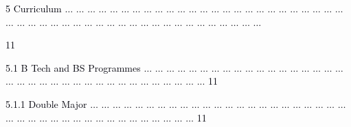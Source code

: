 \documentclass[12pt]{article}
\begin{document}
\vspace{\baselineskip}
{\fontsize{7pt}{8.4pt}\selectfont \textcolor[HTML]{00000A}{5 Curriculum $ \ldots $ $ \ldots $ $ \ldots $ $ \ldots $ $ \ldots $ $ \ldots $ $ \ldots $ $ \ldots $ $ \ldots $ $ \ldots $ $ \ldots $ $ \ldots $ $ \ldots $ $ \ldots $ $ \ldots $ $ \ldots $ $ \ldots $ $ \ldots $ $ \ldots $ $ \ldots $ $ \ldots $ $ \ldots $ $ \ldots $ $ \ldots $ $ \ldots $ $ \ldots $ $ \ldots $ $ \ldots $ $ \ldots $ $ \ldots $ $ \ldots $ $ \ldots $ $ \ldots $ $ \ldots $ $ \ldots $ $ \ldots $ $ \ldots $ $ \ldots $ $ \ldots $ $ \ldots $ $ \ldots $ $ \ldots $ $ \ldots $ $ \ldots $ $ \ldots $ $ \ldots $ $ \ldots $ $ \ldots $  \tabto{5.49in} }{\fontsize{8pt}{9.6pt}\selectfont \textcolor[HTML]{00000A}{11}\par}\par}\par


\vspace{\baselineskip}
\begin{adjustwidth}{0.21in}{0.0in}
{\fontsize{7pt}{8.4pt}\selectfont \textcolor[HTML]{00000A}{5.1 B Tech and BS Programmes $ \ldots $ $ \ldots $ $ \ldots $ $ \ldots $ $ \ldots $ $ \ldots $ $ \ldots $ $ \ldots $ $ \ldots $ $ \ldots $ $ \ldots $ $ \ldots $ $ \ldots $ $ \ldots $ $ \ldots $ $ \ldots $ $ \ldots $ $ \ldots $ $ \ldots $ $ \ldots $ $ \ldots $ $ \ldots $ $ \ldots $ $ \ldots $ $ \ldots $ $ \ldots $ $ \ldots $ $ \ldots $ $ \ldots $ $ \ldots $ $ \ldots $ $ \ldots $ $ \ldots $ $ \ldots $ $ \ldots $ ... 11}\par}\par

\end{adjustwidth}


\vspace{\baselineskip}
\begin{adjustwidth}{0.5in}{0.0in}
{\fontsize{7pt}{8.4pt}\selectfont \textcolor[HTML]{00000A}{5.1.1 Double Major $ \ldots $ $ \ldots $ $ \ldots $ $ \ldots $ $ \ldots $ $ \ldots $ $ \ldots $ $ \ldots $ $ \ldots $ $ \ldots $ $ \ldots $ $ \ldots $ $ \ldots $ $ \ldots $ $ \ldots $ $ \ldots $ $ \ldots $ $ \ldots $ $ \ldots $ $ \ldots $ $ \ldots $ $ \ldots $ $ \ldots $ $ \ldots $ $ \ldots $ $ \ldots $ $ \ldots $ $ \ldots $ $ \ldots $ $ \ldots $ $ \ldots $ $ \ldots $ $ \ldots $ $ \ldots $ $ \ldots $ $ \ldots $ $ \ldots $ $ \ldots $ $ \ldots $ $ \ldots $  11}\par}\par

\end{adjustwidth}
\end{document}
